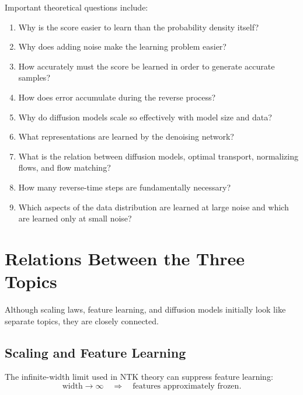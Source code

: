 Important theoretical questions include:

\begin{enumerate}
    \item Why is the score easier to learn than the probability density itself?

    \item Why does adding noise make the learning problem easier?

    \item How accurately must the score be learned in order to generate accurate
    samples?

    \item How does error accumulate during the reverse process?

    \item Why do diffusion models scale so effectively with model size and data?

    \item What representations are learned by the denoising network?

    \item What is the relation between diffusion models, optimal transport,
    normalizing flows, and flow matching?

    \item How many reverse-time steps are fundamentally necessary?

    \item Which aspects of the data distribution are learned at large noise and
    which are learned only at small noise?
\end{enumerate}


\section{Relations Between the Three Topics}

Although scaling laws, feature learning, and diffusion models initially look
like separate topics, they are closely connected.

\subsection{Scaling and Feature Learning}

The infinite-width limit used in NTK theory can suppress feature learning:
\begin{equation}
    \text{width}\rightarrow\infty
    \quad\Rightarrow\quad
    \text{features approximately frozen}.
\end{equation}


